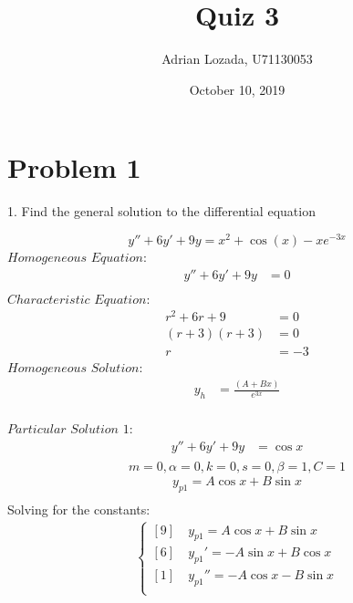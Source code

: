 \documentclass{article}
\author{Adrian Lozada, U71130053}
\title{Quiz 3}
\date{October 10, 2019}
\begin{document}
    \maketitle
    \newpage
    \section{Problem 1}
    \begin{flushleft}
        1. Find the general solution to the differential equation
    \end{flushleft}
    \begin{equation}
        y'' + 6y' + 9y = x^{2} + \cos(x) - xe^{-3x}
    \end{equation}
        $Homogeneous$ $Equation:$
    \begin{align*}
        y'' + 6y' + 9y &= 0 \\
    \end{align*}
        $Characteristic$ $Equation:$
    \begin{align*}
        r^{2} + 6r + 9 &= 0 \\
        (r + 3)(r + 3) &= 0 \\
        r &= -3
    \end{align*}
        $Homogeneous$ $Solution:$
    \begin{align*}
        y_{h} &= \frac{(A + Bx)}{e^{3x}}\\
    \end{align*}

        $Particular$ $Solution$ $1:$
    \begin{align*}
        y'' + 6y' + 9y &= \cos{x} \\
    \end{align*}
        $$m = 0, \alpha = 0, k = 0, s = 0, \beta = 1, C = 1$$
    \begin{align*}
        y_{p1} = A\cos{x} + B\sin{x} \\
    \end{align*}
        Solving for the constants:
    \begin{align*}
        \begin{cases}
            [9] \quad y_{p1} = A\cos{x} + B\sin{x} \\
            [6] \quad y_{p1}' = -A\sin{x} + B\cos{x} \\
            [1] \quad y_{p1}'' = -A\cos{x} - B\sin{x} \\
        \end{cases}
    \end{align*}
\end{document}
